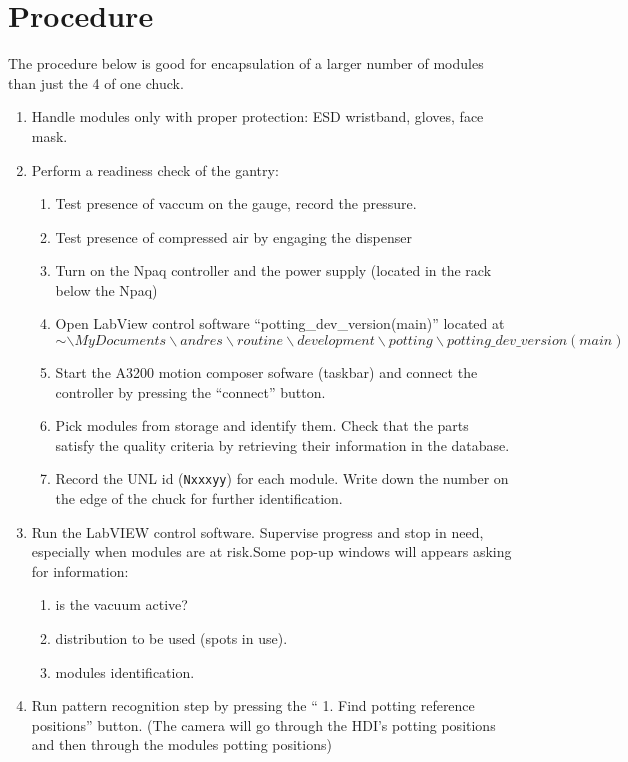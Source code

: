 \documentclass[12pt]{unlsilabsop}
\begin{document}
\section{Procedure}

The procedure below is good for encapsulation of a larger number of modules than just the 4 of one chuck.
\begin{enumerate}
    \item Handle modules only with proper protection: ESD wristband, gloves, face mask.
    \item Perform a readiness check of the gantry:
    \begin{enumerate}
	\item Test presence of vaccum on the gauge, record the pressure.
	\item Test presence of compressed air by engaging the dispenser
        \item Turn on the Npaq controller and the power supply (located in the rack below the Npaq)
        \item Open LabView control software ``potting\_dev\_version(main)'' located at $$ \sim\backslash MyDocuments\backslash andres\backslash routine\backslash development\backslash potting \backslash potting\_dev\_version(main)$$
        \item Start the A3200 motion composer sofware (taskbar) and connect the controller by pressing the ``connect'' button.
       \item Pick modules from storage and identify them. Check that the parts satisfy the quality criteria by retrieving their information in the database. \label{enum:startenacpulation}
    \item Record the UNL id (\texttt{Nxxxyy}) for each module. Write down the number on the edge of the chuck for further identification.
    \end{enumerate}
  \item Run the LabVIEW control software. Supervise progress and stop in need, especially when modules are at risk.Some pop-up windows will appears asking for information:
    \begin{enumerate}
    \item is the vacuum active?
    \item distribution to be used (spots in use).  
    \item modules identification.  
    \end{enumerate}
  \item Run pattern recognition step by pressing the `` 1. Find potting reference positions'' button. (The camera will go through the HDI's potting positions and then through the modules potting positions)

\end{enumerate}
\end{document}
